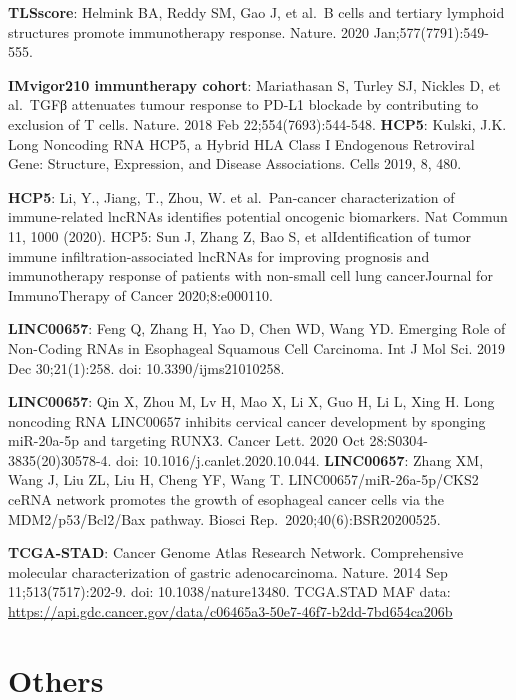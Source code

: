\documentclass[
  12pt,
]{book}
\theoremstyle{definition}
\theoremstyle{definition}
\theoremstyle{definition}
\theoremstyle{definition}
\theoremstyle{remark}
\begin{document}
\textbf{TLSscore}: Helmink BA, Reddy SM, Gao J, et al.~B cells and tertiary lymphoid structures promote immunotherapy response. Nature. 2020 Jan;577(7791):549-555.

\textbf{IMvigor210 immuntherapy cohort}: Mariathasan S, Turley SJ, Nickles D, et al.~TGFβ attenuates tumour response to PD-L1 blockade by contributing to exclusion of T cells. Nature. 2018 Feb 22;554(7693):544-548.
\textbf{HCP5}: Kulski, J.K. Long Noncoding RNA HCP5, a Hybrid HLA Class I Endogenous Retroviral Gene: Structure, Expression, and Disease Associations. Cells 2019, 8, 480.

\textbf{HCP5}: Li, Y., Jiang, T., Zhou, W. et al.~Pan-cancer characterization of immune-related lncRNAs identifies potential oncogenic biomarkers. Nat Commun 11, 1000 (2020).
HCP5: Sun J, Zhang Z, Bao S, et alIdentification of tumor immune infiltration-associated lncRNAs for improving prognosis and immunotherapy response of patients with non-small cell lung cancerJournal for ImmunoTherapy of Cancer 2020;8:e000110.

\textbf{LINC00657}: Feng Q, Zhang H, Yao D, Chen WD, Wang YD. Emerging Role of Non-Coding RNAs in Esophageal Squamous Cell Carcinoma. Int J Mol Sci. 2019 Dec 30;21(1):258. doi: 10.3390/ijms21010258.

\textbf{LINC00657}: Qin X, Zhou M, Lv H, Mao X, Li X, Guo H, Li L, Xing H. Long noncoding RNA LINC00657 inhibits cervical cancer development by sponging miR-20a-5p and targeting RUNX3. Cancer Lett. 2020 Oct 28:S0304-3835(20)30578-4. doi: 10.1016/j.canlet.2020.10.044.
\textbf{LINC00657}: Zhang XM, Wang J, Liu ZL, Liu H, Cheng YF, Wang T. LINC00657/miR-26a-5p/CKS2 ceRNA network promotes the growth of esophageal cancer cells via the MDM2/p53/Bcl2/Bax pathway. Biosci Rep.~2020;40(6):BSR20200525.

\textbf{TCGA-STAD}: Cancer Genome Atlas Research Network. Comprehensive molecular characterization of gastric adenocarcinoma. Nature. 2014 Sep 11;513(7517):202-9. doi: 10.1038/nature13480.
TCGA.STAD MAF data: \url{https://api.gdc.cancer.gov/data/c06465a3-50e7-46f7-b2dd-7bd654ca206b}

\hypertarget{others}{%
\section{Others}\label{others}}
\end{document}
